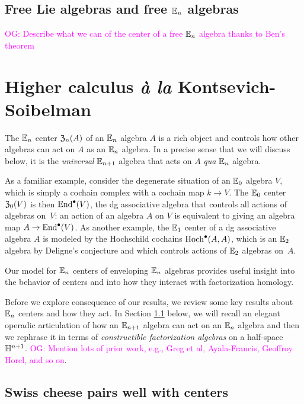 \documentclass[11pt]{amsart}
\numberwithin{equation}{section}
\def\owen{\textcolor{magenta}{OG: }\textcolor{magenta}}
\begin{document}
\subsection{Free Lie algebras and free $\mathbb E_n$ algebras}

\owen{Describe what we can of the center of a free $\mathbb E_n$ algebra thanks to Ben's theorem}

\section{Higher calculus {\it \`a la} Kontsevich-Soibelman}
\label{sec: TT}

The $\mathbb E_n$ center ${\frak Z}_n(A)$ of an $\mathbb E_n$ algebra $A$ is a rich object 
and controls how other algebras can act on $A$ as an $\mathbb E_n$ algebra.
In a precise sense that we will discuss below, 
it is the {\em universal} $\mathbb E_{n+1}$ algebra that acts on $A$ {\em qua} $\mathbb E_n$ algebra. 

As a familiar example, consider the degenerate situation of an $\mathbb E_0$ algebra $V$, 
which is simply a cochain complex with a cochain map $k \to V$.
The $\mathbb E_0$ center ${\frak Z}_0(V)$ is then ${\rm End}^\bullet(V)$,
the dg associative algebra that controls all actions of algebras on~$V$:
an action of an algebra $A$ on $V$ is equivalent to giving an algebra map $A \to {\rm End}^\bullet(V)$.
As another example, the $\mathbb E_1$ center of a dg associative algebra $A$ is modeled by the Hochschild cochains ${\rm Hoch}^\bullet(A,A)$,
which is an $\mathbb E_2$ algebra by Deligne's conjecture and which controls actions of $\mathbb E_2$ algebras on~$A$.

Our model for $\mathbb E_n$ centers of enveloping $\mathbb E_n$ algebras provides useful insight into the behavior of centers and into how they interact with factorization homology.

Before we explore consequence of our results,
we review some key results about $\mathbb E_n$ centers and how they act.
In Section \ref{sec:swiss} below, we will recall an elegant operadic articulation of how an $\mathbb E_{n+1}$ algebra can act on an $\mathbb E_n$ algebra 
and then we rephrase it in terms of {\em constructible factorization algebras} on a half-space~$\mathbb H^{n+1}$. 
\owen{Mention lots of prior work, e.g., Greg et al, Ayala-Francis, Geoffroy Horel, and so on}.

\subsection{Swiss cheese pairs well with centers} \label{sec:swiss}
\end{document}
